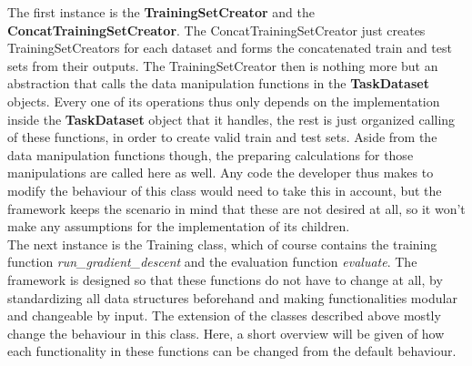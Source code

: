 The first instance is the \textbf{TrainingSetCreator} and the \textbf{ConcatTrainingSetCreator}. The ConcatTrainingSetCreator just creates TrainingSetCreators for each dataset and forms the concatenated train and test sets from their outputs. The TrainingSetCreator then is nothing more but an abstraction that calls the data manipulation functions in the \textbf{TaskDataset} objects. Every one of its operations thus only depends on the implementation inside the \textbf{TaskDataset} object that it handles, the rest is just organized calling of these functions, in order to create valid train and test sets. Aside from the data manipulation functions though, the preparing calculations for those manipulations are called here as well. Any code the developer thus makes to modify the behaviour of this class would need to take this in account, but the framework keeps the scenario in mind that these are not desired at all, so it won't make any assumptions for the implementation of its children. \\

The next instance is the Training class, which of course contains the training function \textit{run\_gradient\_descent} and the evaluation function \textit{evaluate}. The framework is designed so that these functions do not have to change at all, by standardizing all data structures beforehand and making functionalities modular and changeable by input. The extension of the classes described above mostly change the behaviour in this class. Here, a short overview will be given of how each functionality in these functions can be changed from the default behaviour. \\

